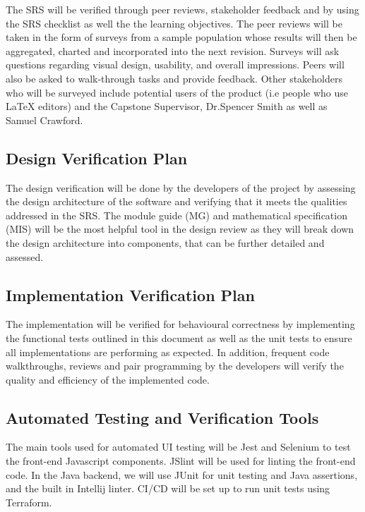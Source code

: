 \documentclass[12pt, titlepage]{article}
\begin{document}
	The SRS will be verified through peer reviews, stakeholder feedback and by using the SRS checklist as well the the learning objectives. The peer reviews will be taken in the form of surveys from a sample population whose results will then be aggregated, charted and incorporated into the next revision. Surveys will ask questions regarding visual design, usability, and overall impressions. Peers will also be asked to walk-through tasks and provide feedback. Other stakeholders who will be surveyed include potential users of the product (i.e people who use LaTeX editors) and the Capstone Supervisor, Dr.Spencer Smith as well as Samuel Crawford.
	
	\subsection{Design Verification Plan}
	
	The design verification will be done by the developers of the project by assessing the design architecture of the software and verifying that it meets the qualities addressed in the SRS. The module guide (MG) and mathematical specification (MIS) will be the most helpful tool in the design review as they will break down the design architecture into components, that can be further detailed and assessed. 
	
	\subsection{Implementation Verification Plan}
	
	The implementation will be verified for behavioural correctness by implementing the functional tests outlined in this document as well as the unit tests to ensure all implementations are performing as expected. In addition, frequent code walkthroughs, reviews and pair programming by the developers will verify the quality and efficiency of the implemented code.
	
	\subsection{Automated Testing and Verification Tools}
	
	The main tools used for automated UI testing will be Jest and Selenium to test the front-end Javascript components. JSlint will be used for linting the front-end code. In the Java backend, we will use JUnit for unit testing and Java assertions, and the built in Intellij linter. CI/CD will be set up to run unit tests using Terraform.
	
\end{document}
